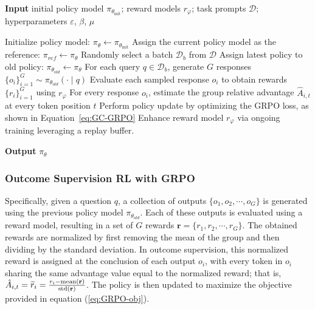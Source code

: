 \begin{itemize}[topsep=0pt]
\begin{itemize}[topsep=0pt]
\begin{algorithm}[t]
  \small
  \caption{Iterative Group Relative Policy Optimization}
  \textbf{Input} initial policy model $\pi_{\theta_{\text{init}}}$; reward models $r_\varphi$; task prompts $\mathcal{D}$; 
  hyperparameters $\varepsilon$, $\beta$, $\mu$
  \begin{algorithmic}[1]
    \State Initialize policy model: $\pi_\theta \leftarrow \pi_{\theta_{\text{init}}}$
       \State Assign the current policy model as the reference: $\pi_{ref} \leftarrow \pi_{\theta}$
      \State Randomly select a batch $\mathcal{D}_b$ from $\mathcal{D}$
      \State Assign latest policy to old policy: $\pi_{\theta_{old}} \leftarrow \pi_{\theta}$
      \State For each query $q \in \mathcal{D}_b$, generate $G$ responses $\{o_i\}_{i=1}^G \sim \pi_{\theta_{old}} (\cdot \mid q)$
      \State Evaluate each sampled response $o_i$ to obtain rewards $\{r_i\}_{i=1}^{G}$ using $r_{\varphi}$ 
      \State For every response $o_i$, estimate the group relative advantage $\hat{A}_{i,t}$ at every token position $t$
        \State Perform policy update by optimizing the GRPO loss, as shown in Equation~\ref{eq:GC-GRPO}
      \EndFor
    \EndFor 
    \State Enhance reward model $r_\varphi$ via ongoing training leveraging a replay buffer.
    \EndFor 
  \end{algorithmic}
  \textbf{Output} $\pi_\theta$
  \label{alg:iter-grpo}
\end{algorithm}

\subsubsection{Outcome Supervision RL with GRPO} Specifically, given a question $q$, a collection of outputs $\{o_1, o_2, \cdots, o_G\}$ is generated using the previous policy model $\pi_{\theta_{old}}$. Each of these outputs is evaluated using a reward model, resulting in a set of $G$ rewards $\mathbf{r}=\{r_1, r_2, \cdots, r_G\}$. The obtained rewards are normalized by first removing the mean of the group and then dividing by the standard deviation. In outcome supervision, this normalized reward is assigned at the conclusion of each output $o_i$, with every token in $o_i$ sharing the same advantage value equal to the normalized reward; that is, $\hat{A}_{i, t} = \widetilde{r}_i = \frac{r_i- {\rm mean}(\mathbf{r})}{{\rm std}(\mathbf{r})}$. The policy is then updated to maximize the objective provided in equation (\ref{eq:GRPO-obj}).


\end{itemize}
\end{itemize}
